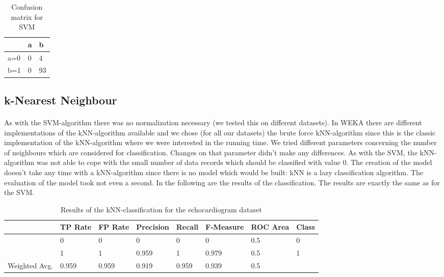 \documentclass[paper=a4, fontsize=11pt]{scrartcl} %
\numberwithin{equation}{section} %
\numberwithin{figure}{section} %
\numberwithin{table}{section} %
\begin{document}
\begin{table}[h]
\centering
\begin{tabular}{|l|ll|}
\hline
 & a &	b \\
\hline
a=0 & 0 & 4 \\
b=1 & 0 & 93\\
\hline
\end{tabular}
\caption{Confusion matrix for SVM}
\end{table}


\subsection{k-Nearest Neighbour}

\paragraph{}As with the SVM-algorithm there was no normalization necessary (we tested this on different datasets). In WEKA there are different implementations of the kNN-algorithm available and we chose (for all our datasets) the brute force kNN-algorithm since this is the classic implementation of the kNN-algorithm where we were interested in the running time. We tried different parameters concerning the number of neighbours which are considered for classification. Changes on that parameter didn't make any differences. As with the SVM, the kNN-algorithm was not able to cope with the small number of data records which should be classified with value 0. The creation of the model doesn't take any time with a kNN-algorithm since there is no model which would be built: kNN is a lazy classification algorithm. The evaluation of the model took not even a second. In the following are the results of the classification. The results are exactly the same as for the SVM.

\begin{table}[h]
\centering
\begin{tabular}{|llllllll|}
	\hline
									&TP Rate   	&FP Rate   &Precision &Recall  &F-Measure   &ROC Area  &Class\\
	\hline
									&0         	&0         &0         &0       &  0         & 0.5      &0\\
  								&1         	&1         &0.959     &1       &0.979       &	0.5      &1\\
  \hline
	Weighted Avg.		&0.959     	&0.959     &0.919   	&0.959   &0.939     	&0.5				&\\
	\hline
\end{tabular}
\caption{Results of the kNN-classification for the echocardiogram dataset}
\end{table}
\end{document}
